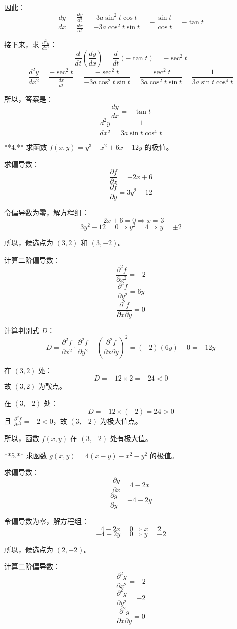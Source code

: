 因此：
\[ \frac{dy}{dx} = \frac{\frac{dy}{dt}}{\frac{dx}{dt}} = \frac{3a \sin^2 t \cos t}{-3a \cos^2 t \sin t} = -\frac{\sin t}{\cos t} = -\tan t \]

接下来，求 \(\frac{d^2y}{dx^2}\)：
\[ \frac{d}{dt}\left( \frac{dy}{dx} \right) = \frac{d}{dt}\left( -\tan t \right) = -\sec^2 t \]
\[ \frac{d^2y}{dx^2} = \frac{-\sec^2 t}{\frac{dx}{dt}} = \frac{-\sec^2 t}{-3a \cos^2 t \sin t} = \frac{\sec^2 t}{3a \cos^2 t \sin t} = \frac{1}{3a \sin t \cos^4 t} \]

所以，答案是：
\[ \frac{dy}{dx} = -\tan t \]
\[ \frac{d^2y}{dx^2} = \frac{1}{3a \sin t \cos^4 t} \]

**4.** 求函数 \( f(x, y) = y^3 - x^2 + 6x - 12y \) 的极值。

求偏导数：
\[ \frac{\partial f}{\partial x} = -2x + 6 \]
\[ \frac{\partial f}{\partial y} = 3y^2 - 12 \]

令偏导数为零，解方程组：
\[ -2x + 6 = 0 \Rightarrow x = 3 \]
\[ 3y^2 - 12 = 0 \Rightarrow y^2 = 4 \Rightarrow y = \pm 2 \]

所以，候选点为 \((3, 2)\) 和 \((3, -2)\)。

计算二阶偏导数：
\[ \frac{\partial^2 f}{\partial x^2} = -2 \]
\[ \frac{\partial^2 f}{\partial y^2} = 6y \]
\[ \frac{\partial^2 f}{\partial x \partial y} = 0 \]

计算判别式 \(D\)：
\[ D = \frac{\partial^2 f}{\partial x^2} \cdot \frac{\partial^2 f}{\partial y^2} - \left( \frac{\partial^2 f}{\partial x \partial y} \right)^2 = (-2)(6y) - 0 = -12y \]

在 \((3, 2)\) 处：
\[ D = -12 \times 2 = -24 < 0 \]
故 \((3, 2)\) 为鞍点。

在 \((3, -2)\) 处：
\[ D = -12 \times (-2) = 24 > 0 \]
且 \(\frac{\partial^2 f}{\partial x^2} = -2 < 0\)，故 \((3, -2)\) 为极大值点。

所以，函数 \(f(x, y)\) 在 \((3, -2)\) 处有极大值。

**5.** 求函数 \( g(x, y) = 4(x - y) - x^2 - y^2 \) 的极值。

求偏导数：
\[ \frac{\partial g}{\partial x} = 4 - 2x \]
\[ \frac{\partial g}{\partial y} = -4 - 2y \]

令偏导数为零，解方程组：
\[ 4 - 2x = 0 \Rightarrow x = 2 \]
\[ -4 - 2y = 0 \Rightarrow y = -2 \]

所以，候选点为 \((2, -2)\)。

计算二阶偏导数：
\[ \frac{\partial^2 g}{\partial x^2} = -2 \]
\[ \frac{\partial^2 g}{\partial y^2} = -2 \]
\[ \frac{\partial^2 g}{\partial x \partial y} = 0 \]

